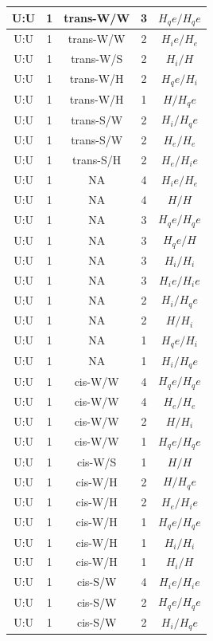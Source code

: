 \begin{center}
\begin{longtable}{c|c|c|c|c}
U:U & 1 & trans-W/W & 3 & $H_qe/H_qe$ \\  \hline
U:U & 1 & trans-W/W & 2 & $H_ie/H_e$ \\  \hline
U:U & 1 & trans-W/S & 2 & $H_i/H$ \\  \hline
U:U & 1 & trans-W/H & 2 & $H_qe/H_i$ \\  \hline
U:U & 1 & trans-W/H & 1 & $H/H_qe$ \\  \hline
U:U & 1 & trans-S/W & 2 & $H_i/H_qe$ \\  \hline
U:U & 1 & trans-S/W & 2 & $H_e/H_e$ \\  \hline
U:U & 1 & trans-S/H & 2 & $H_e/H_ie$ \\  \hline
U:U & 1 & NA & 4 & $H_ie/H_e$ \\  \hline
U:U & 1 & NA & 4 & $H/H$ \\  \hline
U:U & 1 & NA & 3 & $H_qe/H_qe$ \\  \hline
U:U & 1 & NA & 3 & $H_qe/H$ \\  \hline
U:U & 1 & NA & 3 & $H_i/H_i$ \\  \hline
U:U & 1 & NA & 3 & $H_ie/H_ie$ \\  \hline
U:U & 1 & NA & 2 & $H_i/H_qe$ \\  \hline
U:U & 1 & NA & 2 & $H/H_i$ \\  \hline
U:U & 1 & NA & 1 & $H_qe/H_i$ \\  \hline
U:U & 1 & NA & 1 & $H_i/H_qe$ \\  \hline
U:U & 1 & cis-W/W & 4 & $H_qe/H_qe$ \\  \hline
U:U & 1 & cis-W/W & 4 & $H_e/H_e$ \\  \hline
U:U & 1 & cis-W/W & 2 & $H/H_i$ \\  \hline
U:U & 1 & cis-W/W & 1 & $H_qe/H_qe$ \\  \hline
U:U & 1 & cis-W/S & 1 & $H/H$ \\  \hline
U:U & 1 & cis-W/H & 2 & $H/H_qe$ \\  \hline
U:U & 1 & cis-W/H & 2 & $H_e/H_ie$ \\  \hline
U:U & 1 & cis-W/H & 1 & $H_qe/H_qe$ \\  \hline
U:U & 1 & cis-W/H & 1 & $H_i/H_i$ \\  \hline
U:U & 1 & cis-W/H & 1 & $H_i/H$ \\  \hline
U:U & 1 & cis-S/W & 4 & $H_ie/H_ie$ \\  \hline
U:U & 1 & cis-S/W & 2 & $H_qe/H_qe$ \\  \hline
U:U & 1 & cis-S/W & 2 & $H_i/H_qe$ \\  \hline

\end{longtable}
\end{center}
